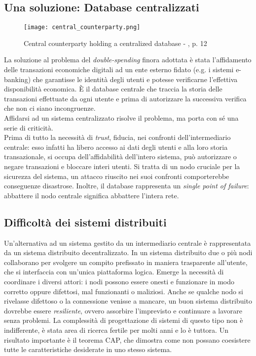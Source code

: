 	\subsection{Una soluzione: Database centralizzati}
		\begin{figure}[ht]
			\centering
			\texttt{[image: central\_counterparty.png]}
			\caption[Central counterparty holding a centralized database]{Central counterparty holding a centralized database - \cite{understanding_bitcoin}, p. 12}
			\label{fig:central_counterparty_img}
		\end{figure}
		La soluzione al problema del \emph{double-spending} finora adottata è stata l'affidamento delle transazioni economiche digitali ad un ente esterno fidato (e.g. i sistemi e-banking) che garantisse le identità degli utenti e potesse verificarne l'effettiva disponibilità economica. È il database centrale che traccia la storia delle transazioni effettuate da ogni utente e prima di autorizzare la successiva verifica che non ci siano incongruenze. \\
		Affidarsi ad un sistema centralizzato risolve il problema, ma porta con sé una serie di criticità. \\
		Prima di tutto la necessità di \emph{trust}, fiducia, nei confronti dell'intermediario centrale: esso infatti ha libero accesso ai dati degli utenti e alla loro storia transazionale, si occupa dell'affidabilità dell'intero sistema, può autorizzare o negare transazioni e bloccare interi utenti. Si tratta di un nodo cruciale per la sicurezza del sistema, un attacco riuscito nei suoi confronti comporterebbe conseguenze disastrose. Inoltre, il database rappresenta un \emph{single point of failure}: abbattere il nodo centrale significa abbattere l'intera rete.

	\subsection{Difficoltà dei sistemi distribuiti}
		Un'alternativa ad un sistema gestito da un intermediario centrale è rappresentata da un sistema distribuito decentralizzato. In un sistema distribuito due o più nodi collaborano per svolgere un compito prefissato in maniera trasparente all'utente, che si interfaccia con un'unica piattaforma logica. Emerge la necessità di coordinare i diversi attori: i nodi possono essere onesti e funzionare in modo corretto oppure difettosi, mal funzionanti o maliziosi. Anche se qualche nodo si rivelasse difettoso o la connessione venisse a mancare, un buon sistema distribuito dovrebbe essere \emph{resiliente}, ovvero assorbire l'imprevisto e continuare a lavorare senza problemi. La complessità di progettazione di sistemi di questo tipo non è indifferente, è stata area di ricerca fertile per molti anni e lo è tuttora. Un risultato importante è il teorema CAP, che dimostra come non possano coesistere tutte le caratteristiche desiderate in uno stesso sistema.


